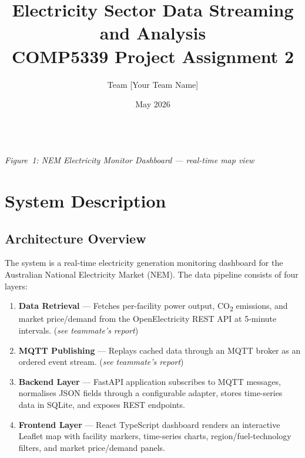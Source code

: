 \documentclass[11pt,a4paper]{article}
\title{\vspace{-2cm}
       \textbf{Electricity Sector Data Streaming and Analysis}\\[4pt]
       \large COMP5339 Project Assignment 2}
\author{Team [Your Team Name]}
\date{May 2026}
\begin{document}
\maketitle
\thispagestyle{empty}

\vfill
\begin{center}
\\[4pt]
\small{\textit{Figure~1: NEM Electricity Monitor Dashboard --- real-time map view}}
\end{center}
\vfill

\newpage
\tableofcontents
\newpage

\section{System Description}

\subsection{Architecture Overview}

The system is a real-time electricity generation monitoring dashboard for the Australian National Electricity Market (NEM). The data pipeline consists of four layers:

\begin{enumerate}
    \item \textbf{Data Retrieval} --- Fetches per-facility power output, CO\textsubscript{2} emissions, and market price/demand from the OpenElectricity REST API at 5-minute intervals. (\textit{see teammate's report})
    \item \textbf{MQTT Publishing} --- Replays cached data through an MQTT broker as an ordered event stream. (\textit{see teammate's report})
    \item \textbf{Backend Layer} --- FastAPI application subscribes to MQTT messages, normalises JSON fields through a configurable adapter, stores time-series data in SQLite, and exposes REST endpoints.
    \item \textbf{Frontend Layer} --- React TypeScript dashboard renders an interactive Leaflet map with facility markers, time-series charts, region/fuel-technology filters, and market price/demand panels.
\end{enumerate}
\end{document}
